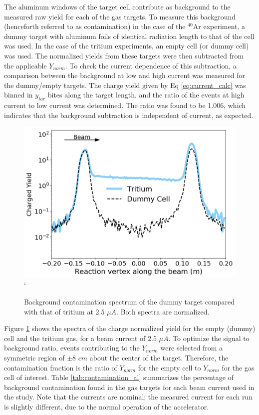 \documentclass[final,5p,times,twocolumn]{elsarticle}
\begin{document}
The aluminum windows of the target cell contribute as background to the measured raw yield for each of the gas targets. To measure this background (henceforth referred to as contamination) in the case of the $^{40}$Ar experiment, a dummy target with aluminum foils of identical radiation length to that of the cell was used. In the case of the tritium experiments, an empty cell (or dummy cell)  was used. The normalized yields from these targets were then subtracted from the applicable $Y_{norm}$. To check the current dependence of this subtraction, a comparison between the background at low and high current was measured for the dummy/empty targets. The charge yield given by Eq \ref{eq:current_calc} was binned in $y_{tar}$ bites along the target length, and the ratio of the events at high current to low current was determined. The ratio was found to be 1.006, which indicates that the background subtraction is independent of current, as expected. 

\begin{figure}[h]
 \centering
 \includegraphics[width=\linewidth]{images/contamination.pdf}`
  \caption{Background contamination spectrum of the dummy target compared with that of tritium at $2.5$ $\mu A$. Both spectra are normalized.}
  \label{fig:bk_empty}
\end{figure}

Figure \ref{fig:bk_empty} shows the spectra of the charge normalized yield for the empty (dummy) cell and the tritium gas, for a beam current of $2.5$ $\mu A$. To optimize the signal to background ratio, events contributing to the $Y_{norm}$ were selected from a symmetric region of $\pm 8$ $cm$ about the center of the target. Therefore, the contamination fraction is the ratio of $Y_{norm}$ for the empty cell to $Y_{norm}$ for the gas cell of interest. Table \ref{tab:contamination_al} summarizes the percentage of background contamination found in the gas targets for each beam current used in the study. Note that the currents are nominal; the measured current for each run is slightly different, due to the normal operation of the accelerator.
 
\end{document}
